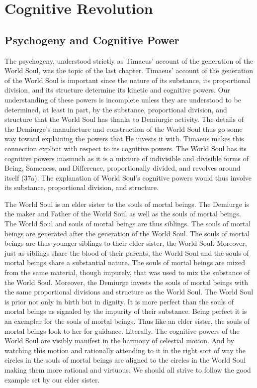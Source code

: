 
\chapter{Cognitive Revolution} %
\label{cha:cognitive_revolution}

\section{Psychogeny and Cognitive Power} %
\label{sec:psychogeny_and_psychic_power}

The psychogeny, understood strictly as Timaeus' account of the generation of the World Soul, was the topic of the last chapter. Timaeus' account of the generation of the World Soul is important since the nature of its substance, its proportional division, and its structure determine its kinetic and cognitive powers. Our understanding of these powers is incomplete unless they are understood to be determined, at least in part, by the substance, proportional division, and structure that the World Soul has thanks to Demiurgic activity. The details of the Demiurge's manufacture and construction of the World Soul thus go some way toward explaining the powers that He invests it with. Timaeus makes this connection explicit with respect to its cognitive powers. The World Soul has its cognitive powers inasmuch as it is a mixture of indivisible and divisible forms of Being, Sameness, and Difference, proportionally divided, and revolves around itself (37a). The explanation of World Soul's cognitive powers would thus involve its substance, proportional division, and structure.

The World Soul is an elder sister to the souls of mortal beings. The Demiurge is the maker and Father of the World Soul as well as the souls of mortal beings. The World Soul and souls of mortal beings are thus siblings. The souls of mortal beings are generated after the generation of the World Soul. The souls of mortal beings are thus younger siblings to their elder sister, the World Soul. Moreover, just as siblings share the blood of their parents, the World Soul and the souls of mortal beings share a substantial nature. The souls of mortal beings are mixed from the same material, though impurely, that was used to mix the substance of the World Soul. Moreover, the Demiurge invests the souls of mortal beings with the same proportional divisions and structure as the World Soul. The World Soul is prior not only in birth but in dignity. It is more perfect than the souls of mortal beings as signaled by the impurity of their substance. Being perfect it is an exemplar for the souls of mortal beings. Thus like an elder sister, the souls of mortal beings look to her for guidance. Literally. The cognitive powers of the World Soul are visibly manifest in the harmony of celestial motion. And by watching this motion and rationally attending to it in the right sort of way the circles in the souls of mortal beings are aligned to the circles in the World Soul making them more rational and virtuous. We should all strive to follow the good example set by our elder sister.

